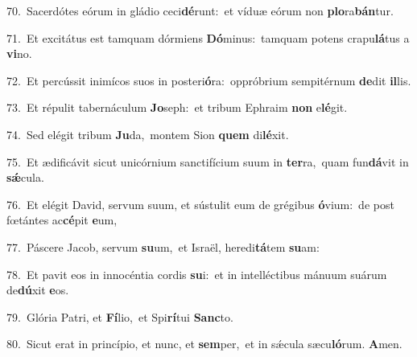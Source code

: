 {\numbfont\textcolor{\numbcolor}{70.}}~Sacerdótes eórum in gládio ceci\-\textbf{dé}\-runt:~\star et víduæ eórum non \textbf{plo}\-ra\-\textbf{bán}\-tur.\par
{\numbfont\textcolor{\numbcolor}{71.}}~Et excitátus est tamquam dórmiens \textbf{Dó}\-minus:~\star tamquam potens crapu\-\textbf{lá}\-tus a \textbf{vi}\-no.\par
{\numbfont\textcolor{\numbcolor}{72.}}~Et percússit inimícos suos in posteri\-\textbf{ó}\-ra:~\star oppróbrium sempitérnum \textbf{de}\-dit \textbf{il}\-lis.\par
{\numbfont\textcolor{\numbcolor}{73.}}~Et répulit tabernáculum \textbf{Jo}\-seph:~\star et tribum Ephraim \textbf{non} e\-\textbf{lé}\-git.\par
{\numbfont\textcolor{\numbcolor}{74.}}~Sed elégit tribum \textbf{Ju}\-da,~\star montem Sion \textbf{quem} di\-\textbf{lé}\-xit.\par
{\numbfont\textcolor{\numbcolor}{75.}}~Et ædificávit sicut unicórnium sanctifícium suum in \textbf{ter}\-ra,~\star quam fun\-\textbf{dá}\-vit in \textbf{sǽ}\-cula.\par
{\numbfont\textcolor{\numbcolor}{76.}}~Et elégit David, servum suum, et sústulit eum de grégibus \textbf{ó}\-vium:~\star de post fœtántes ac\-\textbf{cé}\-pit \textbf{e}\-um,\par
{\numbfont\textcolor{\numbcolor}{77.}}~Páscere Jacob, servum \textbf{su}\-um,~\star et Israël, heredi\-\textbf{tá}\-tem \textbf{su}\-am:\par
{\numbfont\textcolor{\numbcolor}{78.}}~Et pavit eos in innocéntia cordis \textbf{su}\-i:~\star et in intelléctibus mánuum suárum de\-\textbf{dú}\-xit \textbf{e}\-os.\par
{\numbfont\textcolor{\numbcolor}{79.}}~Glória Patri, et \textbf{Fí}\-lio,~\star et Spi\-\textbf{rí}\-tui \textbf{Sanc}\-to.\par
{\numbfont\textcolor{\numbcolor}{80.}}~Sicut erat in princípio, et nunc, et \textbf{sem}\-per,~\star et in sǽcula sæcu\-\textbf{ló}\-rum. \textbf{A}\-men.\par
